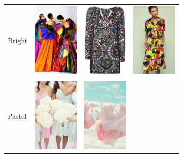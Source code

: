 \newcommand{\dgap}{.65in}
\begin{figure}
\begin{subfigure}[t]{0.48\linewidth}
    \begin{tabular}{m{.05in}|m{\dgap} m{\dgap} m{\dgap}}
    \begin{turn}{90}\small{Bright}\end{turn} &
    \includegraphics[width=.8in]{../style/figures/flickr_on_pinterest/dress/pred_style_Bright/h/0.jpg} &
    \includegraphics[width=.8in]{../style/figures/flickr_on_pinterest/dress/pred_style_Bright/h/1.jpg} &
    \includegraphics[width=.8in]{../style/figures/flickr_on_pinterest/dress/pred_style_Bright/h/2.jpg} \\ \\
    \begin{turn}{90}\small{Pastel}\end{turn} &
    \includegraphics[width=.8in]{../style/figures/flickr_on_pinterest/dress/pred_style_Pastel/h/0.jpg} &
    \includegraphics[width=.8in]{../style/figures/flickr_on_pinterest/dress/pred_style_Pastel/h/1.jpg} &

\end{tabular}
\end{subfigure}
\end{figure}
